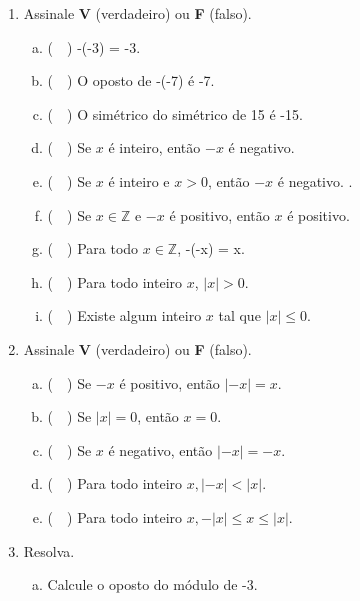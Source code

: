 \documentclass[a4paper,14pt]{article}
\begin{document}
\begin{multicols}{2}
\begin{enumerate}
\begin{enumerate}[a)]
			\end{enumerate}
			\item Assinale \textbf{V} (verdadeiro) ou \textbf{F} (falso).
			\begin{enumerate}[a)]
				\item (~~) -(-3) = -3.
				\item (~~) O oposto de -(-7) é -7.
				\item (~~) O simétrico do simétrico de 15 é -15.
				\item (~~) Se $x$ é inteiro, então $-x$ é negativo.
				\item (~~) Se $x$ é inteiro e $x > 0$, então $-x$ é negativo.
				.
				\item (~~) Se $x \in \mathbb{Z}$ e $-x$ é positivo, então $x$ é positivo.
				\item (~~) Para todo $x \in \mathbb{Z}$, -(-x) = x.
				\item (~~) Para todo inteiro $x$, $|x| > 0$.
				\item (~~) Existe algum inteiro $x$ tal que $|x| \leq 0$.
			\end{enumerate}
			\item Assinale \textbf{V} (verdadeiro) ou \textbf{F} (falso).
			\begin{enumerate}[a)]
				\item (~~) Se $-x$ é positivo, então $|-x| = x$.
				\item (~~) Se $|x| = 0$, então $x = 0$.
				\item (~~) Se $x$ é negativo, então $|-x| = -x$.
				\item (~~) Para todo inteiro $x, |-x| < |x|$.
				\item (~~) Para todo inteiro $x, -|x| \leq x \leq |x|$.
			\end{enumerate}
			\item Resolva.
			\begin{enumerate}[a)]
				\item Calcule o oposto do módulo de -3. \\\\\\\\\\\\\\\\\\\\\\\\\\\\\\\\

\end{enumerate}
\end{enumerate}
\end{multicols}
\end{document}
